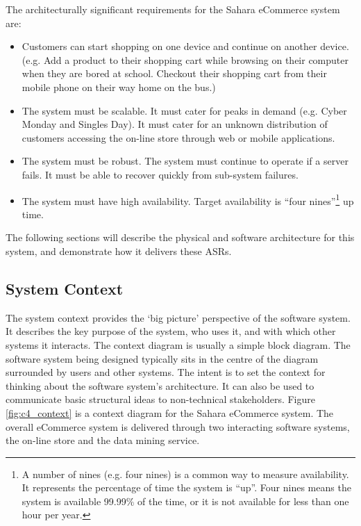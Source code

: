 The architecturally significant requirements for the Sahara eCommerce system are:
\begin{itemize}
    \item Customers can start shopping on one device and continue on another device.
             (e.g. Add a product to their shopping cart while browsing on their computer when they are bored at school.
              Checkout their shopping cart from their mobile phone on their way home on the bus.)
    \item The system must be scalable. It must cater for peaks in demand (e.g. Cyber Monday and Singles Day).
             It must cater for an unknown distribution of customers accessing the on-line store through web or mobile applications.
    \item The system must be robust. The system must continue to operate if a server fails.
             It must be able to recover quickly from sub-system failures.
    \item The system must have high availability.
             Target availability is ``four nines''\footnote{A number of nines (e.g. four nines)
             is a common way to measure availability. It represents the percentage of time the system is ``up''.
             Four nines means the system is available 99.99\% of the time, or it is not available for less than one hour per year.}
            up time.
\end{itemize}
\noindent
The following sections will describe the physical and software architecture for this system, and demonstrate how it delivers these ASRs.

\subsection{System Context}
The system context provides the `big picture' perspective of the software system.
It describes the key purpose of the system, who uses it, and with which other systems it interacts.
The context diagram is usually a simple block diagram.
The software system being designed typically sits in the centre of the diagram surrounded by users and other systems.
The intent is to set the context for thinking about the software system's architecture.
It can also be used to communicate basic structural ideas to non-technical stakeholders.
Figure \ref{fig:c4_context} is a context diagram for the Sahara eCommerce system.
The overall eCommerce system is delivered through two interacting software systems,
the on-line store and the data mining service.

